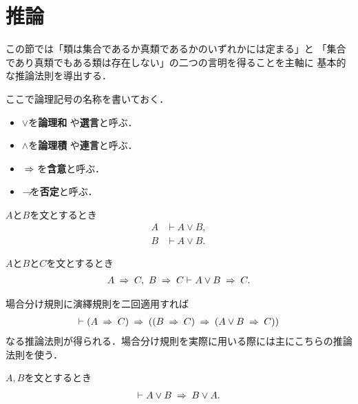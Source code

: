 \section{推論}
	この節では「類は集合であるか真類であるかのいずれかには定まる」と
	「集合であり真類でもある類は存在しない」の二つの言明を得ることを主軸に
	基本的な推論法則を導出する．
	
	ここで論理記号の名称を書いておく．
	\begin{itemize}
		\item $\vee$を{\bf 論理和}
			や{\bf 選言}と呼ぶ．
		\item $\wedge$を{\bf 論理積}
			や{\bf 連言}と呼ぶ．
		\item $\hspace{0.25em}\Rightarrow\hspace{0.25em}$を{\bf 含意}と呼ぶ．
		\item $\rightharpoondown\hspace{-0.25em}$を{\bf 否定}と呼ぶ．
	\end{itemize}
	
	\begin{screen}
		\begin{logicalaxm}[論理和の導入]
		\label{logicalaxm:introduction_of_disjunction}
			$A$と$B$を文とするとき
			\begin{align}
				A &\vdash A \vee B, \\
				B &\vdash A \vee B.
			\end{align}
		\end{logicalaxm}
	\end{screen}
	
	\begin{screen}
		\begin{logicalaxm}[場合分け規則]
		\label{logicalaxm:elimination_of_disjunction}
			$A$と$B$と$C$を文とするとき
			\begin{align}
				A \hspace{0.25em}\Rightarrow\hspace{0.25em} C,\ B \hspace{0.25em}\Rightarrow\hspace{0.25em} C \vdash A \vee B \hspace{0.25em}\Rightarrow\hspace{0.25em} C.
			\end{align}
		\end{logicalaxm}
	\end{screen}
	
	場合分け規則に演繹規則を二回適用すれば
	\begin{align}
		\vdash (A \hspace{0.25em}\Rightarrow\hspace{0.25em} C) \hspace{0.25em}\Rightarrow\hspace{0.25em} ((B \hspace{0.25em}\Rightarrow\hspace{0.25em} C) \hspace{0.25em}\Rightarrow\hspace{0.25em} (A \vee B \hspace{0.25em}\Rightarrow\hspace{0.25em} C))
	\end{align}
	なる推論法則が得られる．場合分け規則を実際に用いる際には主にこちらの推論法則を使う．
	
	\begin{screen}
		\begin{logicalthm}[論理和の可換律]
		\label{logicalthm:commutative_law_of_disjunction}
			$A,B$を文とするとき
			\begin{align}
				\vdash A \vee B \hspace{0.25em}\Rightarrow\hspace{0.25em} B \vee A.
			\end{align}
		\end{logicalthm}
	\end{screen}
	
